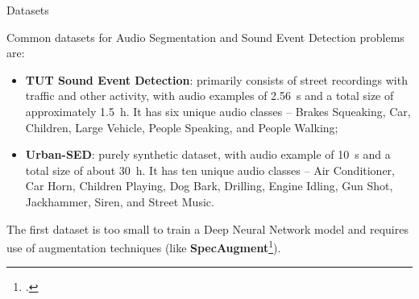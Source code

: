	\begin{frame}{Datasets}

		Common datasets for Audio Segmentation and Sound Event Detection problems are:

		\begin{itemize}
			\item {\textbf{TUT Sound Event Detection}: primarily consists of street recordings with traffic and other
				activity, with audio examples of \SI{2.56}{\second} and a total size of approximately \SI{1.5}{\hour}.
				It has six unique audio classes -- Brakes Squeaking, Car, Children, Large Vehicle, People Speaking,
				and People Walking;}
			\item {\textbf{Urban-SED}: purely synthetic dataset, with audio example of \SI{10}{\second} and a total size
				of about \SI{30}{\hour}. It has ten unique audio classes -- Air Conditioner, Car Horn, Children Playing,
				Dog Bark, Drilling, Engine Idling, Gun Shot, Jackhammer, Siren, and Street Music.}
		\end{itemize}

		The first dataset is too small to train a Deep Neural Network model and requires use of augmentation techniques
		(like \textbf{SpecAugment}\footcite{park19e_interspeech}).

	\end{frame}

